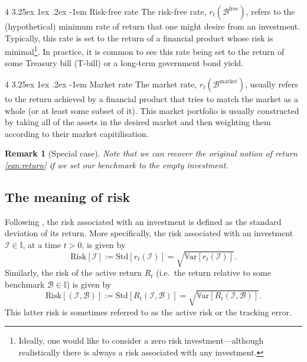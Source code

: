 \documentclass[12pt]{article}
\makeatletter
\newtheorem{remark}{Remark}[section]
\renewcommand\paragraph{%
	\@startsection{paragraph}
	{4}
	{\z@}
	{3.25ex \@plus1ex \@minus.2ex}
	{-1em}
	{\normalfont\normalsize\bfseries\maybe@addperiod}%
}
\newcommand{\maybe@addperiod}[1]{%
	#1\@addpunct{.}%
}
\makeatother
\begin{document}
\paragraph{Risk-free rate} The risk-free rate, $r_t(\mathcal{B}^{\text{free}})$, refers to the (hypothetical) minimum rate of return that one might desire from an investment. Typically, this rate is set to the return of a financial product whose risk is minimal\footnote{Ideally, one would like to consider a zero risk investment---although realistically there is always a risk associated with any investment.}. In practice, it is common to see this rate being set to the return of some Treasury bill (T-bill) or a long-term government bond yield.

\paragraph{Market rate} The market rate, $r_t(\mathcal{B}^{\text{market}})$, usually refers to the return achieved by a financial product that tries to match the market as a whole (or at least some subset of it). This market portfolio is usually constructed by taking all of the assets in the desired market and then weighting them according to their market capitilisation.

\begin{remark}
	[Special case] Note that we can recover the original notion of return \eqref{eqn:return} if we set our benchmark to the empty investment.
\end{remark}
\subsection{The meaning of risk}
Following \cite{grinold1999}, the risk associated with an investment is defined as the standard deviation of its return. More specifically, the risk associated with an investment $\mathcal{I} \in \mathbb{I}$, at a time $t > 0$, is given by
\begin{equation}
	\text{Risk}[\mathcal{I}] := \text{Std}[r_t(\mathcal{I})] = \sqrt{\mathbb{V}\text{ar}[r_t(\mathcal{I})]}.
\end{equation}
Similarly, the risk of the active return $R_t$ (i.e.\ the return relative to some benchmark $\mathcal{B} \in \mathbb{I}$) is given by 
\begin{equation}
	\text{Risk}[(\mathcal{I}, \mathcal{B})] := \text{Std}[R_t(\mathcal{I}, \mathcal{B})] = \sqrt{\mathbb{V}\text{ar}[R_t(\mathcal{I}, \mathcal{B})]}.
\end{equation}
This latter risk is sometimes referred to as the active risk or the tracking error.
\end{document}
